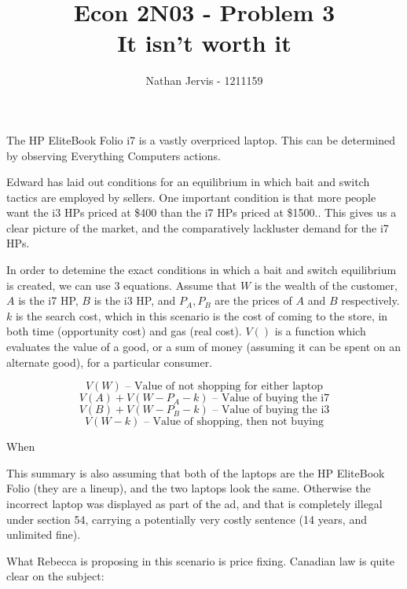 \documentclass[12pt]{article}
\title{\vspace{-3.5cm}Econ 2N03 - Problem 3\\It isn't worth it}
\author{Nathan Jervis - 1211159}
\newcommand\explain[1]{\text{  --  #1}}
\begin{document}
\maketitle


The HP EliteBook Folio i7 is a vastly overpriced laptop. This can be determined by observing Everything Computers actions.

Edward\cite{baitSwitch} has laid out conditions for an equilibrium in which bait and switch tactics are employed by sellers. One important condition is that more people want the i3 HPs priced at \$400 than the i7 HPs priced at \$1500.\cite[pg. 818]{baitSwitch}. This gives us a clear picture of the market, and the comparatively lackluster demand for the i7 HPs.

In order to detemine the exact conditions in which a bait and switch equilibrium is created, we can use 3 equations. Assume that $W$ is the wealth of the customer, $A$ is the i7 HP, $B$ is the i3 HP, and $P_A, P_B$ are the prices of $A$ and $B$ respectively. $k$ is the search cost, which in this scenario is the cost of coming to the store, in both time (opportunity cost) and gas (real cost). $V()$ is a function which evaluates the value of a good, or a sum of money (assuming it can be spent on an alternate good), for a particular consumer.

\begin{equation}
	V(W) \explain{Value of not shopping for either laptop}
\end{equation}
\begin{equation}
	V(A) + V(W-P_A - k) \explain{Value of buying the i7}
\end{equation}
\begin{equation}
	V(B) + V(W-P_B - k) \explain{Value of buying the i3}
\end{equation}
\begin{equation}
	V(W-k) \explain{Value of shopping, then not buying}
\end{equation}

When 

This summary is also assuming that both of the laptops are the HP EliteBook Folio (they are a lineup), and the two laptops look the same. Otherwise the incorrect laptop was displayed as part of the ad, and that is completely illegal under section 54, carrying a potentially very costly sentence (14 years, and unlimited fine).

What Rebecca is proposing in this scenario is price fixing. Canadian law is quite clear on the subject: \cite[45.1.a]{compAct}
\end{document}
